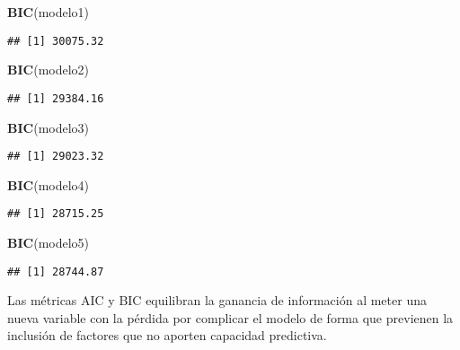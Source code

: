 \documentclass[]{article}
\newenvironment{Shaded}{\begin{snugshade}}{\end{snugshade}}
\newcommand{\KeywordTok}[1]{\textcolor[rgb]{0.13,0.29,0.53}{\textbf{#1}}}
\newcommand{\NormalTok}[1]{#1}
\begin{document}
\begin{Shaded}
\begin{Highlighting}[]
\KeywordTok{BIC}\NormalTok{(modelo1)}
\end{Highlighting}
\end{Shaded}

\begin{verbatim}
## [1] 30075.32
\end{verbatim}

\begin{Shaded}
\begin{Highlighting}[]
\KeywordTok{BIC}\NormalTok{(modelo2)}
\end{Highlighting}
\end{Shaded}

\begin{verbatim}
## [1] 29384.16
\end{verbatim}

\begin{Shaded}
\begin{Highlighting}[]
\KeywordTok{BIC}\NormalTok{(modelo3)}
\end{Highlighting}
\end{Shaded}

\begin{verbatim}
## [1] 29023.32
\end{verbatim}

\begin{Shaded}
\begin{Highlighting}[]
\KeywordTok{BIC}\NormalTok{(modelo4)}
\end{Highlighting}
\end{Shaded}

\begin{verbatim}
## [1] 28715.25
\end{verbatim}

\begin{Shaded}
\begin{Highlighting}[]
\KeywordTok{BIC}\NormalTok{(modelo5)}
\end{Highlighting}
\end{Shaded}

\begin{verbatim}
## [1] 28744.87
\end{verbatim}

Las métricas AIC y BIC equilibran la ganancia de información al meter
una nueva variable con la pérdida por complicar el modelo de forma que
previenen la inclusión de factores que no aporten capacidad predictiva.
\end{document}
